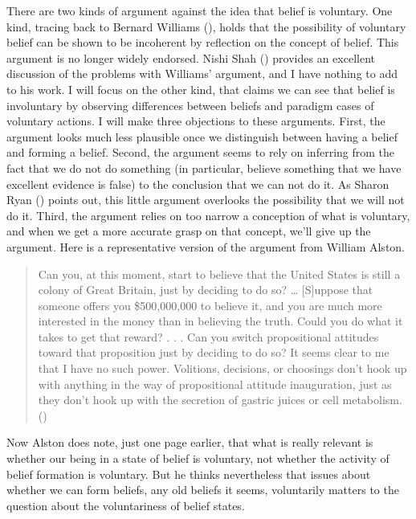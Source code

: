 \documentclass[
  11pt,
  letterpaper,
  DIV=11,
  numbers=noendperiod,
  twoside]{scrartcl}
\begin{document}
There are two kinds of argument against the idea that belief is
voluntary. One kind, tracing back to Bernard Williams
(), holds that the
possibility of voluntary belief can be shown to be incoherent by
reflection on the concept of belief. This argument is no longer widely
endorsed. Nishi Shah () provides an
excellent discussion of the problems with Williams' argument, and I have
nothing to add to his work. I will focus on the other kind, that claims
we can see that belief is involuntary by observing differences between
beliefs and paradigm cases of voluntary actions. I will make three
objections to these arguments. First, the argument looks much less
plausible once we distinguish between having a belief and forming a
belief. Second, the argument seems to rely on inferring from the fact
that we do not do something (in particular, believe something that we
have excellent evidence is false) to the conclusion that we can not do
it. As Sharon Ryan () points out, this
little argument overlooks the possibility that we will not do it. Third,
the argument relies on too narrow a conception of what is voluntary, and
when we get a more accurate grasp on that concept, we'll give up the
argument. Here is a representative version of the argument from William
Alston.

\begin{quote}
Can you, at this moment, start to believe that the United States is
still a colony of Great Britain, just by deciding to do so? \ldots{}
{[}S{]}uppose that someone offers you \$500,000,000 to believe it, and
you are much more interested in the money than in believing the truth.
Could you do what it takes to get that reward? . . . Can you switch
propositional attitudes toward that proposition just by deciding to do
so? It seems clear to me that I have no such power. Volitions,
decisions, or choosings don't hook up with anything in the way of
propositional attitude inauguration, just as they don't hook up with the
secretion of gastric juices or cell metabolism.
()
\end{quote}

Now Alston does note, just one page earlier, that what is really
relevant is whether our being in a state of belief is voluntary, not
whether the activity of belief formation is voluntary. But he thinks
nevertheless that issues about whether we can form beliefs, any old
beliefs it seems, voluntarily matters to the question about the
voluntariness of belief states.
\end{document}
